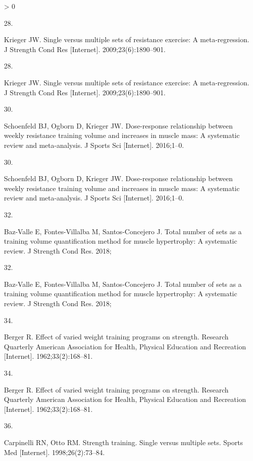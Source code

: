 \documentclass[twoside,10pt]{gihclass} %
\newlength{\cslhangindent}
\newlength{\csllabelwidth}
\newenvironment{CSLReferences}[3] %
 {%
  \setlength{\parindent}{0pt}
  \ifodd #1 \everypar{\setlength{\hangindent}{\cslhangindent}}\ignorespaces\fi
  \ifnum #2 > 0
  \setlength{\parskip}{#2\baselineskip}
  \fi
 }%
 {}
\newcommand{\CSLLeftMargin}[1]{\parbox[t]{\maxof{\widthof{#1}}{\csllabelwidth}}{#1}}
\newcommand{\CSLRightInline}[1]{\parbox[t]{\linewidth}{#1}}
\begin{document}
\begin{CSLReferences}{0}{0}
\leavevmode\hypertarget{ref-RN793}{}%
\CSLLeftMargin{28. }
\CSLRightInline{Krieger JW. Single versus multiple sets of resistance exercise: A meta-regression. J Strength Cond Res {[}Internet{]}. 2009;23(6):1890--901. }

\leavevmode\hypertarget{ref-RN793}{}%
\CSLLeftMargin{28. }
\CSLRightInline{Krieger JW. Single versus multiple sets of resistance exercise: A meta-regression. J Strength Cond Res {[}Internet{]}. 2009;23(6):1890--901. }

\leavevmode\hypertarget{ref-RN1767}{}%
\CSLLeftMargin{30. }
\CSLRightInline{Schoenfeld BJ, Ogborn D, Krieger JW. Dose-response relationship between weekly resistance training volume and increases in muscle mass: A systematic review and meta-analysis. J Sports Sci {[}Internet{]}. 2016;1--0. }

\leavevmode\hypertarget{ref-RN1767}{}%
\CSLLeftMargin{30. }
\CSLRightInline{Schoenfeld BJ, Ogborn D, Krieger JW. Dose-response relationship between weekly resistance training volume and increases in muscle mass: A systematic review and meta-analysis. J Sports Sci {[}Internet{]}. 2016;1--0. }

\leavevmode\hypertarget{ref-RN2130}{}%
\CSLLeftMargin{32. }
\CSLRightInline{Baz-Valle E, Fontes-Villalba M, Santos-Concejero J. Total number of sets as a training volume quantification method for muscle hypertrophy: A systematic review. J Strength Cond Res. 2018; }

\leavevmode\hypertarget{ref-RN2130}{}%
\CSLLeftMargin{32. }
\CSLRightInline{Baz-Valle E, Fontes-Villalba M, Santos-Concejero J. Total number of sets as a training volume quantification method for muscle hypertrophy: A systematic review. J Strength Cond Res. 2018; }

\leavevmode\hypertarget{ref-RN1476}{}%
\CSLLeftMargin{34. }
\CSLRightInline{Berger R. Effect of varied weight training programs on strength. Research Quarterly American Association for Health, Physical Education and Recreation {[}Internet{]}. 1962;33(2):168--81. }

\leavevmode\hypertarget{ref-RN1476}{}%
\CSLLeftMargin{34. }
\CSLRightInline{Berger R. Effect of varied weight training programs on strength. Research Quarterly American Association for Health, Physical Education and Recreation {[}Internet{]}. 1962;33(2):168--81. }

\leavevmode\hypertarget{ref-RN794}{}%
\CSLLeftMargin{36. }
\CSLRightInline{Carpinelli RN, Otto RM. Strength training. Single versus multiple sets. Sports Med {[}Internet{]}. 1998;26(2):73--84. }


\end{CSLReferences}
\end{document}
